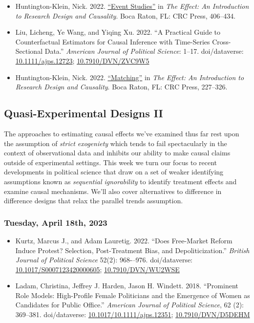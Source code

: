 \documentclass[12pt,]{article}
\begin{document}
\begin{itemize}
\item
  Huntington-Klein, Nick. 2022.
  \href{https://theeffectbook.net/ch-EventStudies.html}{``Event
  Studies''} in \emph{The Effect: An Introduction to Research Design and
  Causality}. Boca Raton, FL: CRC Press, 406--434.
\item
  Liu, Licheng, Ye Wang, and Yiqing Xu. 2022. ``A Practical Guide to
  Counterfactual Estimators for Causal Inference with Time-Series
  Cross-Sectional Data.'' \emph{American Journal of Political Science}:
  1--17. doi/dataverse:
  \href{https://doi.org/10.1111/ajps.12723}{10.1111/ajps.12723};
  \href{https://doi.org/10.7910/DVN/ZVC9W5}{10.7910/DVN/ZVC9W5}
\item
  Huntington-Klein, Nick. 2022.
  \href{https://theeffectbook.net/ch-Matching.html}{``Matching''} in
  \emph{The Effect: An Introduction to Research Design and Causality}.
  Boca Raton, FL: CRC Press, 227--326.
\end{itemize}

\hypertarget{quasi-experimental-designs-ii}{%
\subsection{Quasi-Experimental Designs
II}\label{quasi-experimental-designs-ii}}

\noindent The approaches to estimating causal effects we've examined
thus far rest upon the assumption of \emph{strict exogeniety} which
tends to fail spectacularly in the context of observational data and
inhibits our ability to make causal claims outside of experimental
settings. This week we turn our focus to recent developments in
political science that draw on a set of weaker identifying assumptions
known as \emph{sequential ignorability} to identify treatment effects
and examine causal mechanisms. We'll also cover alternatives to
difference in difference designs that relax the parallel trends
assumption.

\hypertarget{tuesday-april-18th-2023}{%
\subsubsection{Tuesday, April 18th,
2023}\label{tuesday-april-18th-2023}}

\begin{itemize}
\item
  Kurtz, Marcus J., and Adam Lauretig. 2022. ``Does Free-Market Reform
  Induce Protest? Selection, Post-Treatment Bias, and
  Depoliticization.'' \emph{British Journal of Political Science} 52(2):
  968-\/--976. doi/dataverse:
  \href{https://doi.org/10.1017/S0007123420000605}{10.1017/S0007123420000605};
  \href{https://doi.org/10.7910/DVN/WU2WSE}{10.7910/DVN/WU2WSE}
\item
  Ladam, Christina, Jeffrey J. Harden, Jason H. Windett. 2018.
  ``Prominent Role Models: High-Profile Female Politicians and the
  Emergence of Women as Candidates for Public Office.'' \emph{American
  Journal of Political Science}, 62 (2): 369--381. doi/dataverse:
  \href{https://doi.org/10.1111/ajps.12351}{10.1017/10.1111/ajps.12351};
  \href{http://doi.org/10.7910/DVN/D5DEHM}{10.7910/DVN/D5DEHM}
\end{itemize}
\end{document}
